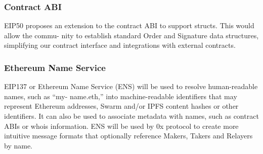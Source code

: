 \documentclass[conference]{IEEEtran}
\begin{document}
    \subsubsection{Contract ABI}
    EIP50 proposes an extension to the contract ABI to support structs. This would allow the commu- nity to establish standard Order and Signature data structures, simplifying our contract interface and integrations with external contracts.
    \subsubsection{Ethereum Name Service}
    EIP137 or Ethereum Name Service (ENS) will be used to resolve human-readable names, such as “my- name.eth,” into machine-readable identifiers that may represent Ethereum addresses, Swarm and/or IPFS content hashes or other identifiers. It can also be used to associate metadata with names, such as contract ABIs or whois information. ENS will be used by 0x protocol to create more intuitive message formats that optionally reference Makers, Takers and Relayers by name.
 
    
    
    
    
    

    \printbibliography
   
    
    
\end{document}
